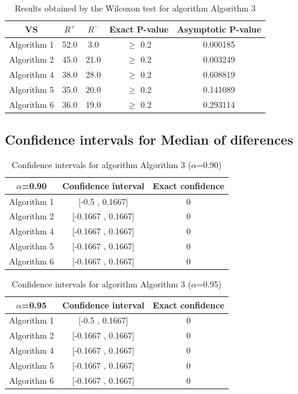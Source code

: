 \documentclass[a4paper,10pt]{article}
\begin{document}
\begin{table}[!htp]
\centering\small
\begin{tabular}{
|c|c|c|c|c|}
\hline
 VS & $R^{+}$ & $R^{-}$ & Exact P-value & Asymptotic P-value \\ \hline 
Algorithm 1 & 52.0 & 3.0 & $\geq$ 0.2 & 0.000185\\ \hline 
Algorithm 2 & 45.0 & 21.0 & $\geq$ 0.2 & 0.003249\\ \hline 
Algorithm 4 & 38.0 & 28.0 & $\geq$ 0.2 & 0.608819\\ \hline 
Algorithm 5 & 35.0 & 20.0 & $\geq$ 0.2 & 0.141089\\ \hline 
Algorithm 6 & 36.0 & 19.0 & $\geq$ 0.2 & 0.293114\\ \hline 

\end{tabular}
\caption{Results obtained by the Wilcoxon test for algorithm Algorithm 3}
\end{table}

\subsection{Confidence intervals for Median of diferences}

\begin{table}[!htp]
\centering\small
\begin{tabular}{
|c|c|c|}
\hline
 $\alpha$=0.90 & Confidence interval & Exact confidence \\ \hline 
Algorithm 1 & [-0.5 , 0.1667] & 0\\ \hline 
Algorithm 2 & [-0.1667 , 0.1667] & 0\\ \hline 
Algorithm 4 & [-0.1667 , 0.1667] & 0\\ \hline 
Algorithm 5 & [-0.1667 , 0.1667] & 0\\ \hline 
Algorithm 6 & [-0.1667 , 0.1667] & 0\\ \hline 

\end{tabular}
\caption{Confidence intervals for algorithm Algorithm 3 ($\alpha$=0.90)}
\end{table}
\begin{table}[!htp]
\centering\small
\begin{tabular}{
|c|c|c|}
\hline
 $\alpha$=0.95 & Confidence interval & Exact confidence \\ \hline 
Algorithm 1 & [-0.5 , 0.1667] & 0\\ \hline 
Algorithm 2 & [-0.1667 , 0.1667] & 0\\ \hline 
Algorithm 4 & [-0.1667 , 0.1667] & 0\\ \hline 
Algorithm 5 & [-0.1667 , 0.1667] & 0\\ \hline 
Algorithm 6 & [-0.1667 , 0.1667] & 0\\ \hline 

\end{tabular}
\caption{Confidence intervals for algorithm Algorithm 3 ($\alpha$=0.95)}
\end{table}
\end{document}
